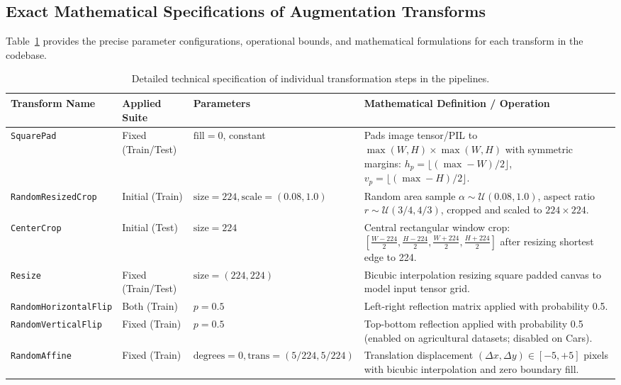 \documentclass[letterpaper,11pt,leqno]{article}
\begin{document}
\subsection{Exact Mathematical Specifications of Augmentation Transforms}

Table~\ref{tab:augmentation_specs} provides the precise parameter configurations, operational bounds, and mathematical formulations for each transform in the codebase.

\begin{table}[H]
\centering
\small
\caption{Detailed technical specification of individual transformation steps in the pipelines.}
\label{tab:augmentation_specs}
\begin{tabularx}{\textwidth}{l >{\raggedright\arraybackslash}p{2.1cm} >{\raggedright\arraybackslash}p{3.0cm} >{\raggedright\arraybackslash}X}
\toprule
\textbf{Transform Name} & \textbf{Applied Suite} & \textbf{Parameters} & \textbf{Mathematical Definition / Operation} \\
\midrule
\texttt{SquarePad} & Fixed (Train/Test) & $\text{fill}=0$, constant & Pads image tensor/PIL to $\max(W, H) \times \max(W, H)$ with symmetric margins: $h_p = \lfloor(\max-W)/2\rfloor$, $v_p = \lfloor(\max-H)/2\rfloor$. \\
\addlinespace
\texttt{RandomResizedCrop} & Initial (Train) & $\text{size}=224, \text{scale}=(0.08, 1.0)$ & Random area sample $\alpha \sim \mathcal{U}(0.08, 1.0)$, aspect ratio $r \sim \mathcal{U}(3/4, 4/3)$, cropped and scaled to $224 \times 224$. \\
\addlinespace
\texttt{CenterCrop} & Initial (Test) & $\text{size}=224$ & Central rectangular window crop: $\left[\frac{W-224}{2}, \frac{H-224}{2}, \frac{W+224}{2}, \frac{H+224}{2}\right]$ after resizing shortest edge to 224. \\
\addlinespace
\texttt{Resize} & Fixed (Train/Test) & $\text{size}=(224, 224)$ & Bicubic interpolation resizing square padded canvas to model input tensor grid. \\
\addlinespace
\texttt{RandomHorizontalFlip} & Both (Train) & $p = 0.5$ & Left-right reflection matrix applied with probability 0.5. \\
\addlinespace
\texttt{RandomVerticalFlip} & Fixed (Train) & $p = 0.5$ & Top-bottom reflection applied with probability 0.5 (enabled on agricultural datasets; disabled on Cars). \\
\addlinespace
\texttt{RandomAffine} & Fixed (Train) & $\text{degrees}=0, \text{trans}=(5/224, 5/224)$ & Translation displacement $(\Delta x, \Delta y) \in [-5, +5]$ pixels with bicubic interpolation and zero boundary fill. \\

\end{tabularx}
\end{table}
\end{document}
